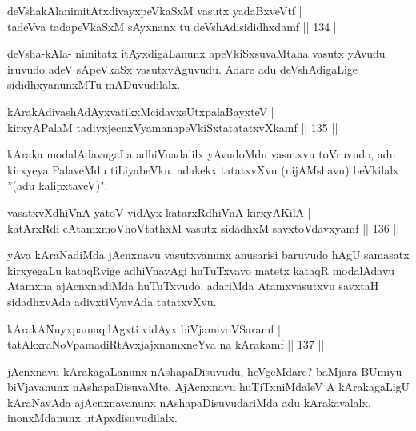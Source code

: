 
\begin{shl}
deVshakAlanimitAtxdivayxpeVkaSxM vasutx yadaBxveVtf |\\
tadeVva tadapeVkaSxM sAyxnanx tu deVshAdisididhxdamf \hfill || 134 ||
\end{shl}

\begin{artha}
deVsha-kAla- nimitatx itAyxdigaLanunx apeVkiSxsuvaMtaha vasutx yAvudu iruvudo adeV sApeVkaSx vasutxvAguvudu. Adare adu deVshAdigaLige sididhxyanunxMTu mADuvudilalx.
\end{artha}


\begin{shl}
kArakAdivashAdAyxvatikxMcidavxsUtxpalaBayxteV |\\
kirxyAPalaM tadivxjecnxVyamanapeVkiSxtatatatxvXkamf \hfill || 135 ||
\end{shl}

\begin{artha}
kAraka modalAdavugaLa adhiVnadalilx yAvudoMdu vasutxvu toVruvudo, adu kirxyeya PalaveMdu tiLiyabeVku. adakekx tatatxvXvu (nijAMshavu) beVkilalx ''(adu kalipxtaveV)".
\end{artha}


\begin{shl}
vasatxvXdhiVnA yatoV vidAyx katarxRdhiVnA kirxyA\s KilA |\\
katArxRdi cA\s \s tamxmoVhoVtathxM vasutx sidadhxM savxtoV\s davxyamf \hfill || 136 ||
\end{shl}

\begin{artha}
yAva kAraNadiMda jAcnxnavu vasutxvanunx anusarisi baruvudo hAgU samasatx kirxyegaLu kataqRvige adhiVnavAgi huTuTxvavo matetx kataqR modalAdavu Atamxna ajAcnxnadiMda huTuTxvudo. adariMda Atamxvasutxvu savxtaH sidadhxvAda adivxtiVyavAda tatatxvXvu.
\end{artha}

\begin{shl}
kArakANuyxpamaqdAgxti vidAyx biVjamivoVSaramf |\\
tatAkxraNoVpamadiRtAvxjajxnamxneYva na kArakamf \hfill || 137 ||
\end{shl}

\begin{artha}
jAcnxnavu kArakagaLanunx nAshapaDisuvudu, heVgeMdare? baMjara BUmiyu biVjavanunx nAshapaDisuvaMte. AjAcnxnavu huTiTxniMdaleV A kArakagaLigU kAraNavAda ajAcnxnavanunx nAshapaDisuvudariMda adu kArakavalalx. inonxMdanunx utApxdisuvudilalx.
\end{artha}

